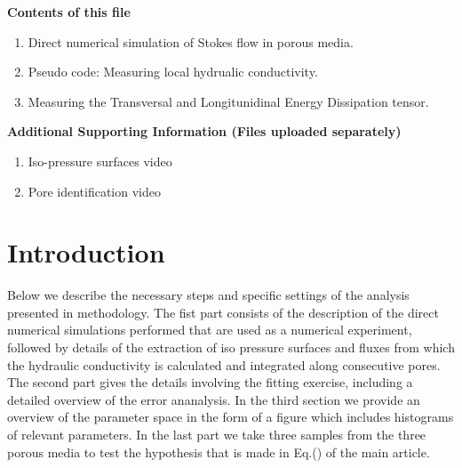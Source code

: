 \documentclass[draft,jgrga]{agutexSI2019}
\begin{document}
\begin{article}

%
%



\noindent\textbf{Contents of this file}
\begin{enumerate}
\item Direct numerical simulation of Stokes flow in porous media.
\item Pseudo code: Measuring local hydrualic conductivity.
\item Measuring the Transversal and Longitunidinal Energy Dissipation tensor.
\end{enumerate}
\noindent\textbf{Additional Supporting Information (Files uploaded separately)}
\begin{enumerate}
\item Iso-pressure surfaces video
\item Pore identification video
\end{enumerate}

\section{Introduction}


Below we describe the necessary steps and specific settings of the analysis presented in methodology. The fist part consists of the description of the direct numerical simulations performed that are used as a numerical experiment, followed by details of the extraction of iso pressure surfaces and fluxes from which the hydraulic conductivity is calculated and integrated along consecutive pores. The second part gives the details involving the fitting exercise, including a detailed overview of the error ananalysis. In the third section we provide an overview of the parameter space in the form of a figure which includes histograms of relevant parameters. In the last part we take three samples from the three porous media to test the hypothesis that is made in Eq.() of the main article. 



\end{article}
\end{document}
